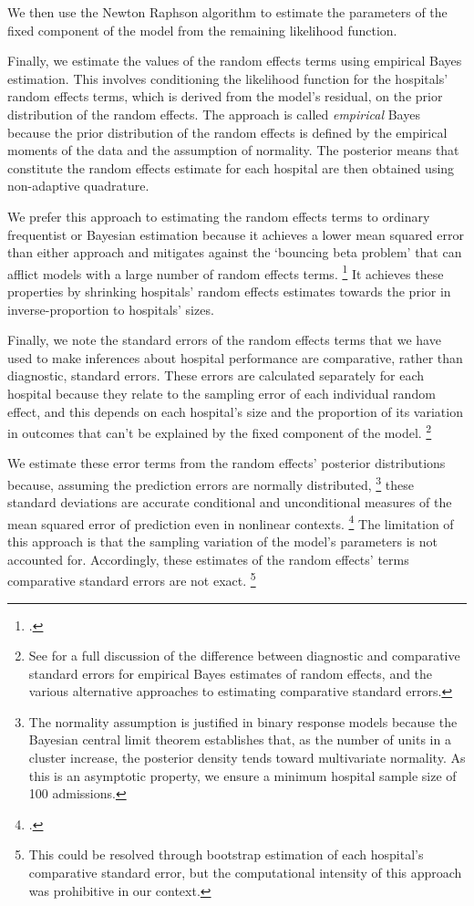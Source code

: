 \documentclass[submission]{grattan}
\begin{document}
We then use the Newton Raphson algorithm to estimate the parameters of the fixed component of the model from the remaining likelihood function.

Finally, we estimate the values of the random effects terms using empirical Bayes estimation.
This involves conditioning the likelihood function for the hospitals' random effects terms, which is derived from the model's residual, on the prior distribution of the random effects.
The approach is called \emph{empirical} Bayes because the prior distribution of the random effects is defined by the empirical moments of the data and the assumption of normality. 
The posterior means that constitute the random effects estimate for each hospital are then obtained using non-adaptive quadrature.

We prefer this approach to estimating the random effects terms to ordinary frequentist or Bayesian estimation because it achieves a lower mean squared error than either approach and mitigates against the `bouncing beta problem' that can afflict models with a large number of random effects terms.%
	\footcite{Stata-multilevel-modelling}
It achieves these properties by shrinking hospitals' random effects estimates towards the prior in inverse-proportion to hospitals' sizes.

Finally, we note the standard errors of the random effects terms that we have used to make inferences about hospital performance are comparative, rather than diagnostic, standard errors.
These errors are calculated separately for each hospital because they relate to the sampling error of each individual random effect, and this depends on each hospital's size and the proportion of its variation in outcomes that can't be explained by the fixed component of the model.%
	\footnote{See \textcite{Stata-multilevel-modelling} for a full discussion of the difference between diagnostic and comparative standard errors for empirical Bayes estimates of random effects, and the various alternative approaches to estimating comparative standard errors.}

We estimate these error terms from the random effects' posterior distributions because, assuming the prediction errors are normally distributed,%
	\footnote{The normality assumption is justified in binary response models because the Bayesian central limit theorem establishes that, as the number of units in a cluster increase, the posterior density tends toward multivariate normality.
	As this is an asymptotic property, we ensure a minimum hospital sample size of 100 admissions.}
these standard deviations are accurate conditional and unconditional measures of the mean squared error of prediction even in nonlinear contexts.%
	\footcite{Stata-multilevel-modelling}
The limitation of this approach is that the sampling variation of the model's parameters is not accounted for.
Accordingly, these estimates of the random effects' terms comparative standard errors are not exact.%
	\footnote{This could be resolved through bootstrap estimation of each hospital's comparative standard error, but the computational intensity of this approach was prohibitive in our context.}
\end{document}
